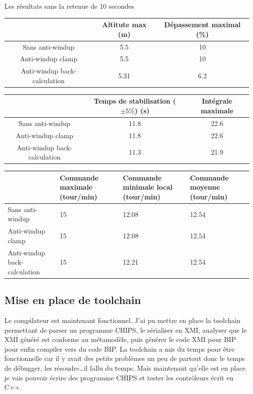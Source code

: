 \documentclass{article}
\begin{document}
Les résultats sans la retenue de 10 secondes

\begin{tabular}{|c|c|c|}
    \hline & Altitute max (m) & Dépassement maximal (\%) \\
    \hline Sans anti-windup & 5.5 & 10 \\
    \hline Anti-windup clamp & 5.5 & 10 \\
    \hline Anti-windup back-calculation & 5.31 & 6.2 \\
    \hline 
\end{tabular}

\begin{tabular}{|c|c|c|}
    \hline & Temps de stabilisation ($\pm 5\%$) (s) & Intégrale maximale \\
    \hline Sans anti-windup & 11.8 & 22.6 \\
    \hline Anti-windup clamp & 11.8 & 22.6 \\
    \hline Anti-windup back-calculation & 11.3 & 21.9 \\
    \hline
\end{tabular}



\begin{tabular}{|C{3.5cm}|C{3.5cm}|C{3.5cm}|C{3.5cm}|}
    \hline & Commande maximale (tour/min) & Commande minimale local (tour/min) & Commande moyenne (tour/min) \\
    \hline Sans anti-windup & 15 & 12.08 & 12.54 \\
    \hline Anti-windup clamp & 15 & 12.08 & 12.54 \\
    \hline Anti-windup back-calculation & 15 & 12.21 & 12.54 \\
    \hline
\end{tabular}

\subsection{Mise en place de toolchain}

Le compilateur est maintenant fonctionnel. J'ai pu mettre en place la toolchain permettant de parser un programme CHIPS, le sérialiser en XMI, analyser que le XMI généré est conforme au métamodèle, puis générer le code XMI pour BIP pour enfin compiler vers du code BIP.
La toolchain a mis du temps pour être fonctionnelle car il y avait des petits problèmes un peu de partout donc le temps de débugger, les résoudre\dots il fallu du temps.
Mais maintenant qu'elle est en place je vais pouvoir écrire des programme CHIPS et tester les contrôleurs écrit en C++.
\end{document}

